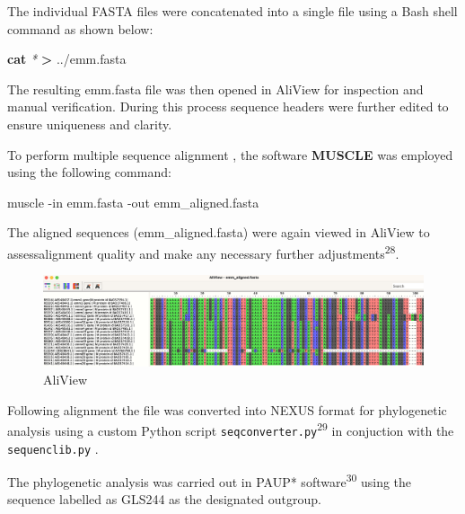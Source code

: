 \documentclass[
]{article}
\newenvironment{Shaded}{\begin{snugshade}}{\end{snugshade}}
\newcommand{\AttributeTok}[1]{\textcolor[rgb]{0.13,0.29,0.53}{#1}}
\newcommand{\ExtensionTok}[1]{#1}
\newcommand{\FunctionTok}[1]{\textcolor[rgb]{0.13,0.29,0.53}{\textbf{#1}}}
\newcommand{\NormalTok}[1]{#1}
\newcommand{\OperatorTok}[1]{\textcolor[rgb]{0.81,0.36,0.00}{\textbf{#1}}}
\newcommand{\PreprocessorTok}[1]{\textcolor[rgb]{0.56,0.35,0.01}{\textit{#1}}}
\begin{document}
The individual FASTA files were concatenated into a single file using a
Bash shell command as shown below:

\begin{Shaded}
\begin{Highlighting}[]
\FunctionTok{cat} \PreprocessorTok{*} \OperatorTok{\textgreater{}}\NormalTok{ ../emm.fasta}
\end{Highlighting}
\end{Shaded}

The resulting emm.fasta file was then opened in AliView for inspection
and manual verification. During this process sequence headers were
further edited to ensure uniqueness and clarity.

To perform multiple sequence alignment , the software \textbf{MUSCLE}
was employed using the following command:

\begin{Shaded}
\begin{Highlighting}[]
\ExtensionTok{muscle} \AttributeTok{{-}in}\NormalTok{ emm.fasta }\AttributeTok{{-}out}\NormalTok{ emm\_aligned.fasta}
\end{Highlighting}
\end{Shaded}

The aligned sequences (emm\_aligned.fasta) were again viewed in AliView
to assessalignment quality and make any necessary further
adjustments\textsuperscript{28}.

\begin{figure}

{\centering \includegraphics[width=1\linewidth]{Images/AliView} 

}

\caption{AliView}\label{fig:unnamed-chunk-37}
\end{figure}

Following alignment the file was converted into NEXUS format for
phylogenetic analysis using a custom Python script
\texttt{seqconverter.py}\textsuperscript{29} in conjuction with the
\texttt{sequenclib.py} .

The phylogenetic analysis was carried out in PAUP*
software\textsuperscript{30} using the sequence labelled as GLS244 as
the designated outgroup.
\end{document}

